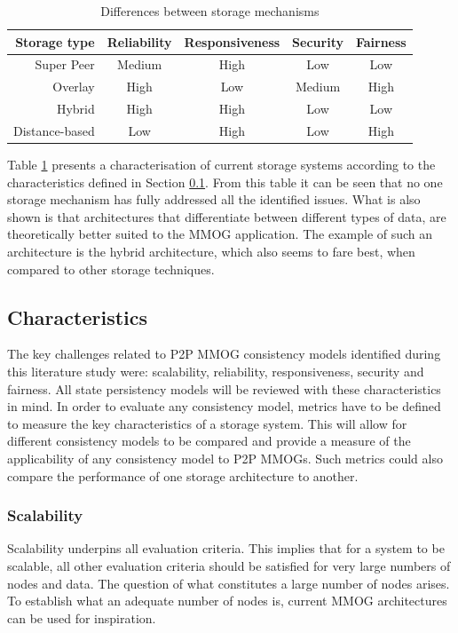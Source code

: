 \documentclass[10pt,a4paper,journal,cspaper,compsoc]{IEEEtran}
\begin{document}
\begin{table}[htbp]
\centering
\begin{tabular}{|r|c|c|c|c|}
\hline
Storage type & Reliability & Responsiveness & Security & Fairness\\
\hline
Super Peer & Medium & High & Low & Low\\
Overlay & High & Low & Medium & High\\
Hybrid & High & High & Low & Low\\
Distance-based & Low & High & Low & High\\
\hline
\end{tabular}
\caption{Differences between storage mechanisms} \label{tab_storage}
\end{table}
%
Table \ref{tab_storage} presents a characterisation of current storage systems according to the characteristics defined in Section
\ref{key_challenges_cm}. From this table it can be seen that no one storage mechanism has fully addressed all the identified issues. What is also
shown is that architectures that differentiate between different types of data, are theoretically better suited to the MMOG application. The example
of such an architecture is the hybrid architecture, which also seems to fare best, when compared to other storage techniques.

\subsection{Characteristics}
\label{key_challenges_cm}

The key challenges related to P2P MMOG consistency models identified during this literature study were: scalability, reliability, responsiveness,
security and fairness. All state persistency models will be reviewed with these characteristics in mind. In order to evaluate any consistency model,
metrics have to be defined to measure the key characteristics of a storage system. This will allow for different consistency models to be compared
and provide a measure of the applicability of any consistency model to P2P MMOGs. Such metrics could also compare the performance of one storage
architecture to another.

\subsubsection{Scalability}
Scalability underpins all evaluation criteria. This implies that for a system to be scalable, all other evaluation criteria should be satisfied for
very large numbers of nodes and data. The question of what constitutes a large number of nodes arises. To establish what an adequate number of nodes
is, current MMOG architectures can be used for inspiration.
\end{document}
